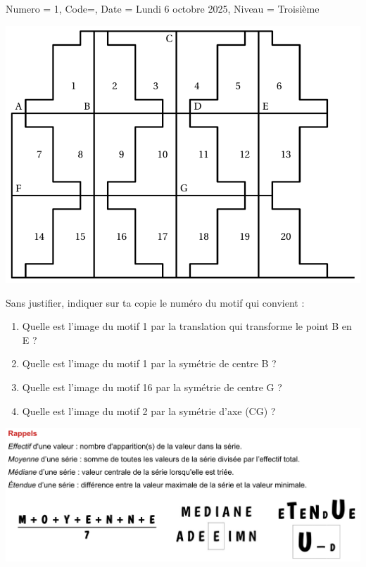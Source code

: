 \documentclass[11pt]{article}
\begin{document}
\begin{Maquette}[DM]{
        Numero = 1, Code={}, Date = Lundi 6 octobre 2025, Niveau = Troisième
    }
    \begin{exercice}
        \begin{multicols}{2}
            \begin{center}
                \includegraphics[width=\linewidth]{Images/DM1-exercice2.png}
            \end{center}
            
            \columnbreak
            Sans justifier, indiquer sur ta copie le numéro du motif qui convient :
            \begin{enumerate}
                \item Quelle est l’image du motif 1 par la translation qui transforme le point B en E ?
                \item Quelle est l’image du motif 1 par la symétrie de centre B ?
                \item Quelle est l’image du motif 16 par la symétrie de centre G ?
                \item Quelle est l’image du motif 2 par la symétrie d’axe (CG) ?
            \end{enumerate}
        \end{multicols}
    \end{exercice}

    \includegraphics[width=.8\linewidth]{Images/RappelsStats.png}


\end{Maquette}
\end{document}
